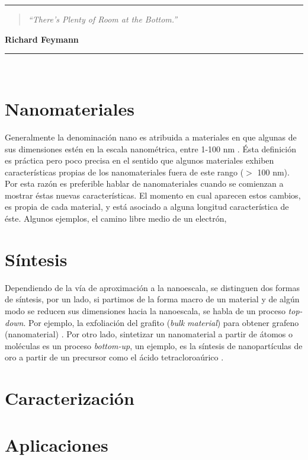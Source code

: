 \noindent
\rule{\linewidth}{1 pt}
\begin{flushright}
	\begin{quotation}
		\small{
			\textit{``There’s Plenty of Room at the Bottom.''}}
	\end{quotation}
	\bf{Richard Feymann}
\end{flushright}
\noindent
\rule{\linewidth}{1 pt}\\
\vfill
\section{Nanomateriales}
Generalmente la denominación nano es atribuida a materiales en que algunas de sus dimensiones estén en la escala nanométrica, entre 1-100 nm \cite{Gressler2013}. Ésta definición es práctica pero poco precisa en el sentido que algunos materiales exhiben características propias de los nanomateriales fuera de este rango ($>$ 100 nm). Por esta razón es preferible hablar de nanomateriales cuando se comienzan a mostrar éstas nuevas características. El momento en cual aparecen estos cambios, es propia de cada material, y está asociado a alguna longitud característica de éste. Algunos ejemplos, el camino libre medio de un electrón, 

\section{Síntesis}
Dependiendo de la vía de aproximación a la nanoescala, se distinguen dos formas de síntesis, por un lado, si partimos de la forma macro de un material y de algún modo se reducen sus dimensiones hacia la nanoescala, se habla de un proceso \textit{top-down}. Por ejemplo, la exfoliación del grafito (\textit{bulk material}) para obtener grafeno (nanomaterial) \cite{Novoselov2004}.  Por otro lado, sintetizar un nanomaterial a partir de átomos o moléculas es un proceso \textit{bottom-up}, un ejemplo, es la síntesis de nanopartículas de oro a partir de un precursor como el ácido tetracloroaúrico \cite{Daniel2004}.

\section{Caracterización}


\section{Aplicaciones}

